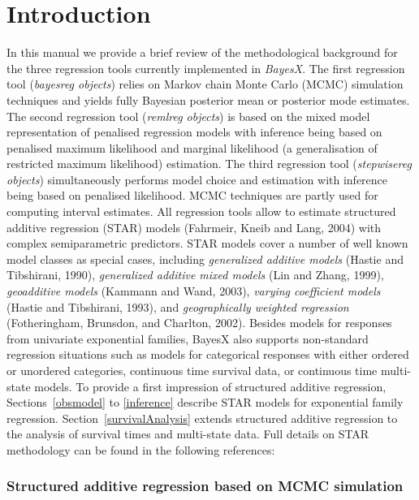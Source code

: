 \documentclass[11pt,a4paper,twoside]{bayesxarticle}
\begin{document}
\MakeShortVerb{\#}


\newpage

\section{Introduction}

In this manual we provide a brief review of the methodological
background for the three regression tools currently implemented in
{\em BayesX}. The first regression tool ({\em bayesreg objects})
relies on Markov chain Monte Carlo (MCMC) simulation techniques and
yields fully Bayesian posterior mean or posterior mode estimates.
The second regression tool ({\em remlreg objects}) is based on the
mixed model representation of penalised regression models with
inference being based on penalised maximum likelihood and marginal
likelihood (a generalisation of restricted maximum likelihood)
estimation. The third regression tool ({\em stepwisereg objects})
simultaneously performs model choice and estimation with inference
being based on penalised likelihood. MCMC techniques are partly used
for computing interval estimates. All regression tools allow to
estimate structured additive regression (STAR) models (Fahrmeir,
Kneib and Lang, 2004) with complex semiparametric predictors. STAR
models cover a number of well known model classes as special cases,
including {\em generalized additive models} (Hastie and Tibshirani,
1990), {\em generalized additive mixed models} (Lin and Zhang,
1999), {\em geoadditive models} (Kammann and Wand, 2003), {\em
varying coefficient models} (Hastie and Tibshirani, 1993), and {\em
geographically weighted regression} (Fotheringham, Brunsdon, and
Charlton, 2002). Besides models for responses from univariate
exponential families, BayesX also supports non-standard regression
situations such as models for categorical responses with either
ordered or unordered categories, continuous time survival data, or
continuous time multi-state models. To provide a first impression of
structured additive regression, Sections~\ref{obsmodel} to
\ref{inference} describe STAR models for exponential family
regression. Section~\ref{survivalAnalysis} extends structured
additive regression to the analysis of survival times and
multi-state data. Full details on STAR methodology can be found in
the following references:

\subsubsection*{Structured additive regression based on MCMC
simulation}
\end{document}
